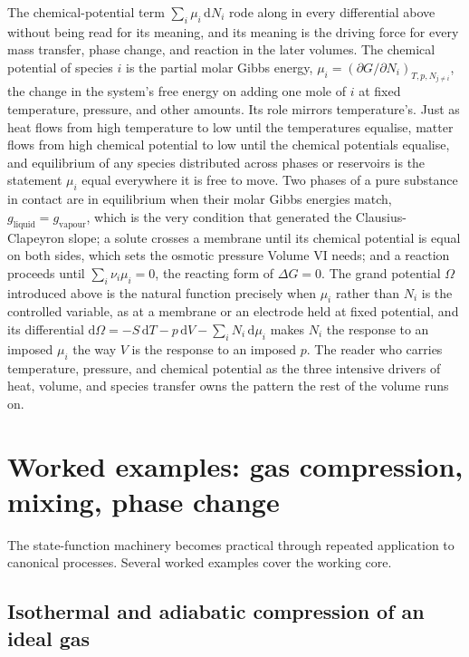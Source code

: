 The chemical-potential term $\sum_i \mu_i\,\mathrm{d}N_i$ rode along in every
differential above without being read for its meaning, and its meaning is the driving
force for every mass transfer, phase change, and reaction in the later volumes. The
chemical potential of species $i$ is the partial molar Gibbs energy,
$\mu_i = (\partial G/\partial N_i)_{T,p,N_{j\neq i}}$, the change in the system's
free energy on adding one mole of $i$ at fixed temperature, pressure, and other
amounts. Its role mirrors temperature's. Just as heat flows from high temperature to
low until the temperatures equalise, matter flows from high chemical potential to low
until the chemical potentials equalise, and equilibrium of any species distributed
across phases or reservoirs is the statement $\mu_i$ equal everywhere it is free to
move. Two phases of a pure substance in contact are in equilibrium when their molar
Gibbs energies match, $g_{\text{liquid}} = g_{\text{vapour}}$, which is the very
condition that generated the Clausius-Clapeyron slope; a solute crosses a membrane
until its chemical potential is equal on both sides, which sets the osmotic pressure
Volume VI needs; and a reaction proceeds until $\sum_i \nu_i \mu_i = 0$, the reacting
form of $\Delta G = 0$. The grand potential $\Omega$ introduced above is the natural
function precisely when $\mu_i$ rather than $N_i$ is the controlled variable, as at a
membrane or an electrode held at fixed potential, and its differential
$\mathrm{d}\Omega = -S\,\mathrm{d}T - p\,\mathrm{d}V - \sum_i N_i\,\mathrm{d}\mu_i$
makes $N_i$ the response to an imposed $\mu_i$ the way $V$ is the response to an
imposed $p$. The reader who carries temperature, pressure, and chemical potential as
the three intensive drivers of heat, volume, and species transfer owns the pattern
the rest of the volume runs on.

\section{Worked examples: gas compression, mixing, phase change}

The state-function machinery becomes practical through repeated
application to canonical processes. Several worked examples cover the
working core.

\subsection{Isothermal and adiabatic compression of an ideal gas}

